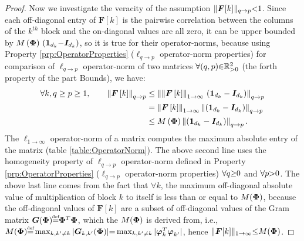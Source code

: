 \begin{proof}
Now we investigate the veracity of the assumption $\Vert\boldsymbol{F}[k] \Vert_{q \to p} {<} 1$.
Since each off-diagonal entry of $\boldsymbol{F}[k]$ is the pairwise correlation between the columns of the $k^{th}$ block and the on-diagonal values are all zero, it can be upper bounded by $M\left( \boldsymbol{\Phi} \right) \, \left( \boldsymbol{1}_{d_k} {-} \boldsymbol{I}_{d_k} \right)$, so it is true for their operator-norms, because using Property \ref{prp:OperatorProperties} ($\ell_{q {\to} p}$ operator-norm properties) for comparison of $\ell_{q {\to} p}$ operator-norm of two matrices $\forall (q , p) {\in} \mathbb{R}^2_{{>} 0}$ (the forth property of the part Bounds), we have:
\begin{gather*}
\begin{aligned}
\forall k, q \geq p \geq 1, \qquad
\left\lVert\boldsymbol{F} \left[ k \right]\right\rVert_{q \to p} &\leq 
\left\lVert\left\lVert\boldsymbol{F} \left[ k \right]\right\rVert_{1 \to \infty} \, \left( \boldsymbol{1}_{d_k} - \boldsymbol{I}_{d_k} \right)\right\rVert_{q \to p} \\
&= \left\lVert\boldsymbol{F} \left[ k \right]\right\rVert_{1 \to \infty} \left\lVert\left( \boldsymbol{1}_{d_k} - \boldsymbol{I}_{d_k} \right)\right\rVert_{q \to p} \\
&\leq M\left( \boldsymbol{\Phi} \right) \left\lVert\left( \boldsymbol{1}_{d_k} - \boldsymbol{I}_{d_k} \right)\right\rVert_{q \to p}.
\end{aligned}
\end{gather*}
The $\ell_{1 {\to} \infty}$ operator-norm of a matrix computes the maximum absolute entry of the matrix (table \ref{table:OperatorNorm}). 
The above second line uses the homogeneity property of $\ell_{q {\to} p}$ operator-norm defined in Property \ref{prp:OperatorProperties} ($\ell_{q {\to} p}$ operator-norm properties) $\forall q {\geq} 0$ and $\forall p {>} 0$.
The above last line comes from the fact that $\forall k$, the maximum off-diagonal absolute value of multiplication of block $k$ to itself is less than or equal to $M(\boldsymbol{\Phi})$, because the off-diagonal values of $\boldsymbol{F}[k]$ are a subset of off-diagonal values of the Gram matrix $\boldsymbol{G}(\myPhi) {\myeq} \myPhi^T \myPhi$, which the $M(\boldsymbol{\Phi})$ is derived from, i.e., $M(\myPhi) {\myeq}  \max_{k,k' \neq k} \vert \boldsymbol{G}_{k,k'}(\myPhi) \vert \seq \max_{k,k' \neq k} \vert \boldsymbol{\varphi}^T_k \boldsymbol{\varphi}^{ }_{k'} \vert$, hence $\Vert \boldsymbol{F}[k] \Vert_{1 \to \infty} {\leq} M(\boldsymbol{\Phi})$.


\end{proof}

